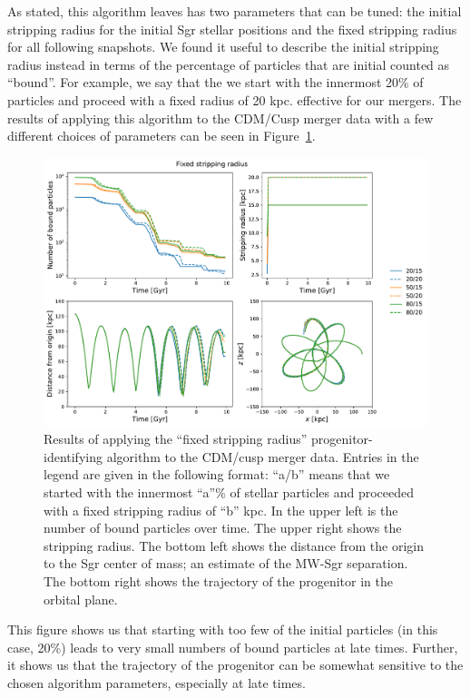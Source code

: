 As stated, this algorithm leaves has two parameters that can be tuned: the
initial stripping radius for the initial Sgr stellar positions and the fixed
stripping radius for all following snapshots. We found it useful to describe the
initial stripping radius instead in terms of the percentage of particles
that are initial counted as ``bound''. For example, we say that the we start
with the innermost 20\% of particles and proceed with a fixed radius of 20 kpc. 
effective for our mergers. The results of applying this algorithm to the
CDM/Cusp merger data with a few different choices of parameters can be seen in
Figure~\ref{fig:fixed_star}.

\begin{figure}
    \centering
    \includegraphics[width=0.9\linewidth]{figs/fixed_star.pdf}
    \caption{%
        Results of applying the ``fixed stripping radius''
        progenitor-identifying algorithm to the CDM/cusp merger data. Entries in
        the legend are given in the following format: ``a/b'' means that we
        started with the innermost ``a''\% of stellar particles and proceeded
        with a fixed stripping radius of ``b'' kpc.  In the upper left is the
        number of bound particles over time.  The upper right shows the
        stripping radius.  The bottom left shows the distance from the origin
        to the Sgr center of mass; an estimate of the MW-Sgr separation.  The
        bottom right shows the trajectory of the progenitor in the orbital
        plane.
    }
    \label{fig:fixed_star}
\end{figure}

This figure shows us that starting with too few of the initial particles (in
this case, 20\%) leads to very small numbers of bound particles at late times.
Further, it shows us that the trajectory of the progenitor can be somewhat
sensitive to the chosen algorithm parameters, especially at late times.


